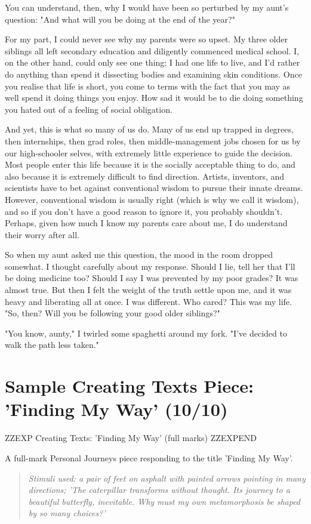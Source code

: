 \documentclass[a4paper]{article}
\begin{document}
You can understand, then, why I would have been so perturbed by my aunt's question: "And what will you be doing at the end of the year?"

For my part, I could never see why my parents were so upset. My three older siblings all left secondary education and diligently commenced medical school. I, on the other hand, could only see one thing: I had one life to live, and I'd rather do anything than spend it dissecting bodies and examining skin conditions. Once you realise that life is short, you come to terms with the fact that you may as well spend it doing things you enjoy. How sad it would be to die doing something you hated out of a feeling of social obligation.

And yet, this is what so many of us do. Many of us end up trapped in degrees, then internships, then grad roles, then middle-management jobs chosen for us by our high-schooler selves, with extremely little experience to guide the decision. Most people enter this life because it is the socially acceptable thing to do, and also because it is extremely difficult to find direction. Artists, inventors, and scientists have to bet against conventional wisdom to pursue their innate dreams. However, conventional wisdom is usually right (which is why we call it wisdom), and so if you don't have a good reason to ignore it, you probably shouldn't. Perhaps, given how much I know my parents care about me, I do understand their worry after all.

So when my aunt asked me this question, the mood in the room dropped somewhat. I thought carefully about my response. Should I lie, tell her that I'll be doing medicine too? Should I say I was prevented by my poor grades? It was almost true. But then I felt the weight of the truth settle upon me, and it was heavy and liberating all at once. I was different. Who cared? This was my life. "So, then? Will you be following your good older siblings?"

"You know, aunty," I twirled some spaghetti around my fork. "I've decided to walk the path less taken."

\newpage

\section{Sample Creating Texts Piece: 'Finding My Way' (10/10)}


ZZEXP Creating Texts: 'Finding My Way' (full marks) ZZEXPEND


A full-mark Personal Journeys piece responding to the title 'Finding My Way'.
\begin{quote}
\textit{Stimuli used: a pair of feet on asphalt with painted arrows pointing in many directions; 'The caterpillar transforms without thought. Its journey to a beautiful butterfly, inevitable. Why must my own metamorphosis be shaped by so many choices?'}
\end{quote}
\end{document}
